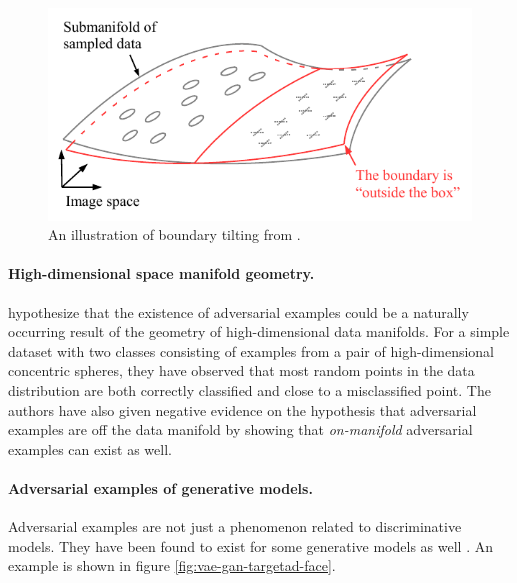 \documentclass{article}
\begin{document}
\begin{figure}[H]
	\begin{center}
		\includegraphics[width=\columnwidth]{figures/adversarial-examples/tanay-newPerspective.pdf}
	\end{center}
	\caption{An illustration of boundary tilting from \citet{Tanay:2016:ABTPPAE}.}
	\label{fig:tanay-boundary-tilting}
\end{figure}

\paragraph{High-dimensional space manifold geometry.} \citet{Gilmer:2018:AS} hypothesize that the existence of adversarial examples could be a naturally occurring result of the geometry of high-dimensional data manifolds. For a simple dataset with two classes consisting of examples from a pair of high-dimensional concentric spheres, they have observed that most random points in the data distribution are both correctly classified and close to a misclassified point. The authors have also given negative evidence on the hypothesis that adversarial examples are off the data manifold by showing that \textit{on-manifold} adversarial examples can exist as well.

\paragraph{Adversarial examples of generative models.} Adversarial examples are not just a phenomenon related to discriminative models. They have been found to exist for some generative models as well \citep{Goodfellow:2014:EHAE,Kos:2018:AEGM}. An example is shown in figure \ref{fig:vae-gan-targetad-face}.
\end{document}
